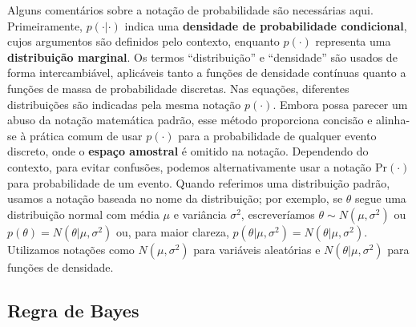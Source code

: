 Alguns comentários sobre a notação de probabilidade são necessárias aqui. Primeiramente, $ p(\cdot|\cdot) $ indica uma \textbf{densidade de probabilidade condicional}, cujos argumentos são definidos pelo contexto, enquanto $ p(\cdot) $ representa uma \textbf{distribuição marginal}. Os termos ``distribuição'' e ``densidade'' são usados de forma intercambiável, aplicáveis tanto a funções de densidade contínuas quanto a funções de massa de probabilidade discretas. Nas equações, diferentes distribuições são indicadas pela mesma notação $ p(\cdot) $. Embora possa parecer um abuso da notação matemática padrão, esse método proporciona concisão e alinha-se à prática comum de usar $ p(\cdot) $ para a probabilidade de qualquer evento discreto, onde o \textbf{espaço amostral} é omitido na notação. Dependendo do contexto, para evitar confusões, podemos alternativamente usar a notação $ \text{Pr}(\cdot) $ para probabilidade de um evento. Quando referimos uma distribuição padrão, usamos a notação baseada no nome da distribuição; por exemplo, se $ \theta $ segue uma distribuição normal com média $ \mu $ e variância $ \sigma^2 $, escreveríamos $ \theta \sim N(\mu, \sigma^2) $ ou $ p(\theta) = N(\theta|\mu, \sigma^2) $ ou, para maior clareza, $ p(\theta|\mu, \sigma^2) = N(\theta|\mu, \sigma^2) $. Utilizamos notações como $ N(\mu, \sigma^2) $ para variáveis aleatórias e $ N(\theta|\mu, \sigma^2) $ para funções de densidade.

\subsection{Regra de Bayes}

